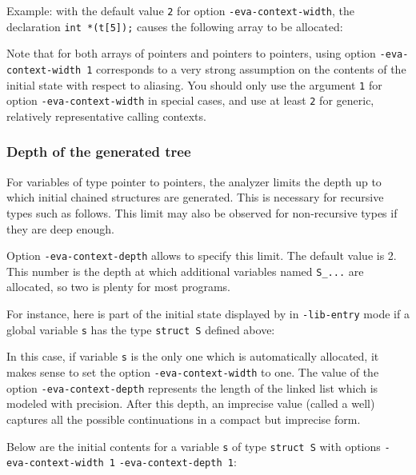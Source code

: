 \documentclass{frama-c-book}
\begin{document}
Example: with the default value \lstinline|2| for option
\lstinline|-eva-context-width|, the declaration \lstinline|int *(t[5]);|
causes the following array to be allocated:

Note that for both arrays of pointers and pointers to pointers,
using option \lstinline|-eva-context-width 1| corresponds to a very strong
assumption on the contents of the initial state with respect to aliasing.
You should only use the argument \lstinline|1| for
option \lstinline|-eva-context-width| in special cases, and use at least
\lstinline|2| for generic, relatively representative calling contexts.

\subsubsection{Depth of the generated tree}

For variables of type pointer to pointers, the analyzer limits the depth up
to which initial chained structures are generated.
This is necessary for recursive types such as follows.
This limit may also be observed for non-recursive types if they are deep enough.

Option \lstinline|-eva-context-depth| allows to specify this limit.
The default value is 2. This number is the depth at which
additional variables named \lstinline|S_...| are allocated, so
two is plenty for most programs.

For instance, here is part of the initial state displayed by \Eva{}
in \lstinline|-lib-entry| mode if a global variable \lstinline|s|
has the type \lstinline|struct S| defined above:

In this case, if variable \lstinline|s| is the only one which
is automatically allocated, it makes sense to set the option
\lstinline|-eva-context-width| to one.  The value of the
option \lstinline|-eva-context-depth| represents the length of the
linked list which is modeled with precision. After this depth,
an imprecise value (called a well) captures all the possible continuations
in a compact but imprecise form.

Below are the initial contents for a variable \lstinline|s| of type \lstinline|struct S|
with options \lstinline|-eva-context-width 1|
\lstinline|-eva-context-depth 1|:

\end{document}
